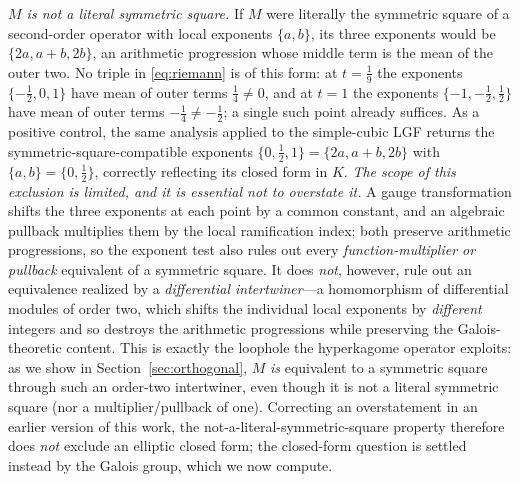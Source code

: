 \documentclass[cntp]{ipart}
\theoremstyle{plain}
\theoremstyle{remark}
\begin{document}
\emph{$M$ is not a literal symmetric square.} If $M$ were literally the symmetric square of a second-order operator
with local exponents $\{a,b\}$, its three exponents would be $\{2a,a+b,2b\}$, an arithmetic progression whose middle
term is the mean of the outer two. No triple in \eqref{eq:riemann} is of this form: at $t=\tfrac19$ the exponents
$\{-\tfrac12,0,1\}$ have mean of outer terms $\tfrac14\neq0$, and at $t=1$ the exponents $\{-1,-\tfrac12,\tfrac12\}$
have mean of outer terms $-\tfrac14\neq-\tfrac12$; a single such point already suffices. As a
positive control, the same analysis applied to the simple-cubic LGF returns the symmetric-square-compatible
exponents $\{0,\tfrac12,1\}=\{2a,a+b,2b\}$ with $\{a,b\}=\{0,\tfrac12\}$, correctly reflecting its closed form in
$K$. \emph{The scope of this exclusion is limited, and it is essential not to overstate it.} A gauge transformation
shifts the three exponents at each point by a common constant, and an algebraic pullback multiplies them by the
local ramification index; both preserve arithmetic progressions, so the exponent test also rules out every
\emph{function-multiplier or pullback} equivalent of a symmetric square. It does \emph{not}, however, rule out an
equivalence realized by a \emph{differential intertwiner}---a homomorphism of differential modules of order two,
which shifts the individual local exponents by \emph{different} integers and so destroys the arithmetic
progressions while preserving the Galois-theoretic content. This is exactly the loophole the hyperkagome operator
exploits: as we show in Section~\ref{sec:orthogonal}, $M$ \emph{is} equivalent to a symmetric square through such an
order-two intertwiner, even though it is not a literal symmetric square (nor a multiplier/pullback of one). Correcting an overstatement in
an earlier version of this work, the not-a-literal-symmetric-square property therefore does \emph{not} exclude an
elliptic closed form; the closed-form question is settled instead by the Galois group, which we now compute.
\end{document}
